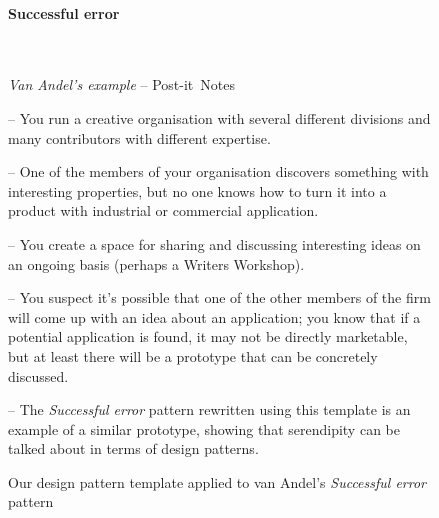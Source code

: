 \begin{figure}[!ht]
\begin{mdframed}
\paragraph{\textbf{Successful error}}~
\baselineskip
\begin{flushright}\emph{Van Andel's example} -- Post-it\texttrademark\ Notes
\end{flushright}
\vspace{-.15cm}
\begin{description}[itemsep=2pt]
\item[{\tt context}] -- You run a creative organisation with several different divisions and many contributors with different expertise.  
\item[{\tt problem}] -- One of the members of your organisation
  discovers something with interesting properties, but no one
  knows how to turn it into a product with industrial or commercial application.
\item[{\tt solution}] -- You create a space for sharing and discussing
  interesting ideas on an ongoing basis (perhaps a Writers Workshop).
\item[{\tt rationale}] -- You suspect it's possible that one of the
  other members of the firm will come up with an idea about an
  application; you know that if a potential application is found, it
  may not be directly marketable, but at least there will be a
  prototype that can be concretely discussed.
\item[{\tt resolution}] -- The \emph{Successful error} pattern
  rewritten using this template is an example of a similar
  prototype, showing that serendipity can be talked about in
  terms of design patterns.
\end{description}
\end{mdframed}
\caption{Our design pattern template applied to van Andel's \emph{Successful error} pattern\label{fig:va-pattern-figure}}
\end{figure}





